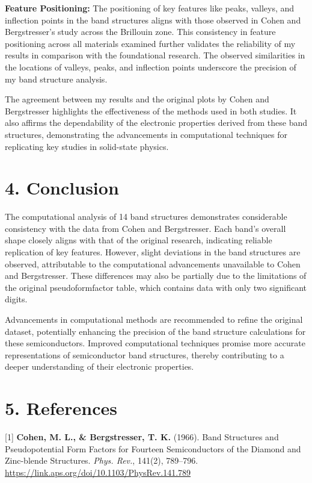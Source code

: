 \documentclass[twocolumn]{article}[h]
\begin{document}
\textbf{Feature Positioning:} The positioning of key features like peaks, valleys, and inflection points in the band structures aligns with those observed in Cohen and Bergstresser's study across the Brillouin zone. This consistency in feature positioning across all materials examined further validates the reliability of my results in comparison with the foundational research. The observed similarities in the locations of valleys, peaks, and inflection points underscore the precision of my band structure analysis.

The agreement between my results and the original plots by Cohen and Bergstresser highlights the effectiveness of the methods used in both studies. It also affirms the dependability of the electronic properties derived from these band structures, demonstrating the advancements in computational techniques for replicating key studies in solid-state physics.

\section*{4. Conclusion}

The computational analysis of 14 band structures demonstrates considerable consistency with the data from Cohen and Bergstresser. Each band's overall shape closely aligns with that of the original research, indicating reliable replication of key features. However, slight deviations in the band structures are observed, attributable to the computational advancements unavailable to Cohen and Bergstresser. These differences may also be partially due to the limitations of the original pseudoformfactor table, which contains data with only two significant digits.

Advancements in computational methods are recommended to refine the original dataset, potentially enhancing the precision of the band structure calculations for these semiconductors. 
Improved computational techniques promise more accurate representations of semiconductor band structures, thereby contributing to a deeper understanding of their electronic properties.

\section*{5. References}
[1] \textbf{Cohen, M. L., \& Bergstresser, T. K.} (1966). Band Structures and Pseudopotential Form Factors for Fourteen Semiconductors of the Diamond and Zinc-blende Structures. \emph{Phys. Rev.}, 141(2), 789--796. \url{https://link.aps.org/doi/10.1103/PhysRev.141.789}
\end{document}
